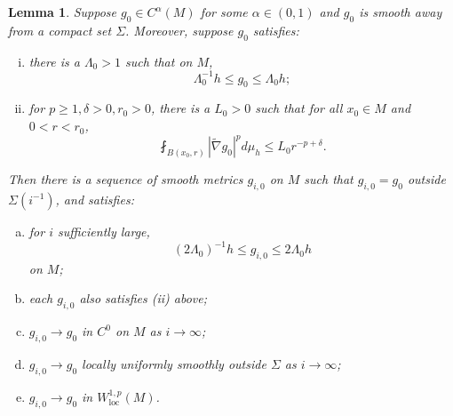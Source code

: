 \documentclass[12pt]{amsart}
\theoremstyle{plain}
\theoremstyle{plain}
\newtheorem{lemma}[subsection]{Lemma}
\theoremstyle{definition}
\theoremstyle{remark}
\numberwithin{equation}{subsection}
\newcommand{\hdel}{\tilde{\nabla}}
\begin{document}
\begin{lemma}\label{lem:mollification-scheme}
    Suppose $g_0 \in C^\alpha(M)$ for some $\alpha \in (0,1)$ and $g_0$ is smooth away from a compact set $\Sigma$. Moreover, suppose $g_0$ satisfies:
    \begin{enumerate}[(i)]
        \item there is a $\Lambda_0 > 1$ such that on $M$,
        \begin{equation*}
            \Lambda_0^{-1}h \leq g_0 \leq \Lambda_0 h;
        \end{equation*}
        \item for $p \geq 1, \delta > 0, r_0 > 0$, there is a $L_0 > 0$ such that for all $x_0 \in M$ and $0 < r < r_0$,
        \begin{equation*}
            \fint_{B(x_0,r)} |\hdel g_0|^p d\mu_h \leq L_0 r^{-p+\delta}.
        \end{equation*}
    \end{enumerate}
    Then there is a sequence of smooth metrics $g_{i,0}$ on $M$ such that $g_{i,0} = g_0$ outside $\Sigma(i^{-1})$, and satisfies:
    \begin{enumerate}[(a)]
        \item for $i$ sufficiently large,
        \begin{equation*}
            (2\Lambda_0)^{-1}h \leq g_{i,0} \leq 2\Lambda_0 h
        \end{equation*}
        on $M$;
        \item each $g_{i,0}$ also satisfies (ii) above;
        \item $g_{i,0} \to g_0$ in $C^0$ on $M$ as $i \to \infty$;
        \item $g_{i,0} \to g_0$ locally uniformly smoothly outside $\Sigma$ as $i\to\infty$;
        \item $g_{i,0} \to g_0$ in $W^{1,p}_\text{loc}(M)$.
    \end{enumerate}
\end{lemma}
\end{document}
